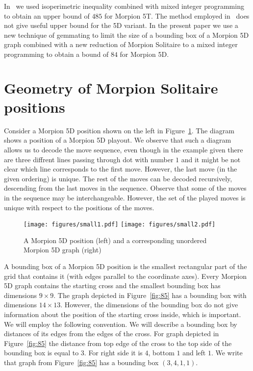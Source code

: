 \documentclass[a4paper,UKenglish]{lipics}
\begin{document}
In~\cite{} we used isoperimetric inequality combined with mixed integer programming to obtain an upper bound of $485$ for Morpion 5T. 
The method employed in~\cite{} does not give useful upper bound for the 5D variant.
In the present paper we use a new technique of gemmating to limit the size of a bounding box of a Morpion 5D graph combined with a new reduction of Morpion Solitaire to a mixed integer programming to obtain a bound of $84$ for Morpion 5D. 
  
\section{Geometry of Morpion Solitaire positions}


Consider a Morpion 5D position shown on the left in Figure~\ref{fig:small}. 
The diagram shows a position of a Morpion 5D playout.
We observe that such a diagram allows us to decode the move sequence,
  even though in the example given there are three diffrent lines passing through dot with number $1$
  and it might be not clear which line corresponds to the first move.
However, the last move (in the given ordering) is unique. 
The rest of the moves can be decoded recursively, descending from the last moves in the sequence.
Observe that some of the moves in the sequence may be interchangeable.
However, the set of the played moves is unique with respect to the positions of the moves.

\begin{figure}
    \texttt{[image: figures/small1.pdf]}
    \texttt{[image: figures/small2.pdf]}
    \caption{\label{fig:small}
      A Morpion 5D position (left) and a corresponding unordered Morpion 5D graph (right)
    }
\end{figure}

A bounding box of a Morpion 5D position is the smallest rectangular part of the grid that contains it 
  (with edges parallel to the coordinate axes).
Every Morpion 5D graph contains the starting cross and the smallest bounding box has dimensions $9 \times 9$.
The graph depicted in Figure~\ref{fig:85} has a bounding box with dimensions $14 \times 13$.
However, the dimensions of the bounding box do not give information about the position of the starting cross inside, which is important.
We will employ the following convention.
We will describe a bounding box by distances of its edges from the edges of the cross.
For graph depicted in Figure~\ref{fig:85} the distance from top edge of the cross to the top side of the bounding box is equal to $3$. For right side it is $4$, bottom $1$ and left $1$. 
We write that graph from Figure~\ref{fig:85} has a bounding box $(3,4,1,1)$.
  
\end{document}
